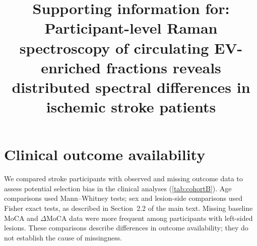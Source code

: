 \documentclass[preprint,12pt]{elsarticle}
\begin{document}
\begin{frontmatter}

\title{Supporting information for: \\ Participant-level Raman spectroscopy of circulating EV-enriched fractions reveals distributed spectral differences in ischemic stroke patients}


\end{frontmatter}


\renewcommand{\thefigure}{S\arabic{figure}}
\setcounter{figure}{0}
\renewcommand{\thetable}{S\arabic{table}}
\setcounter{table}{0}

\renewcommand{\thesection}{S\arabic{section}}
\renewcommand{\thesubsection}{S\arabic{section}.\arabic{subsection}}
\renewcommand{\thesubsubsection}{S\arabic{section}.\arabic{subsection}.\arabic{subsubsection}}
\setcounter{section}{0}


\section{Clinical outcome availability}

We compared stroke participants with observed and missing outcome data to assess potential selection bias in the clinical analyses (\cref{tab:cohortB}). Age comparisons used Mann--Whitney tests; sex and lesion-side comparisons used Fisher exact tests, as described in Section~2.2 of the main text. Missing baseline MoCA and $\Delta$MoCA data were more frequent among participants with left-sided lesions. These comparisons describe differences in outcome availability; they do not establish the cause of missingness.
\end{document}
